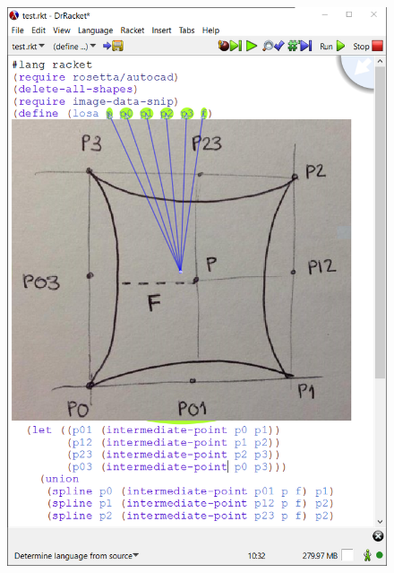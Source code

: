 \begin{figure}[h]
\centering
\begin{minipage}[t]{.495\textwidth}
  \centering
  \includegraphics[width=1\linewidth]{images/losa0}
  \label{fig:losa0}
\end{minipage}%
~
~
\begin{minipage}[t]{.495\textwidth}
  \centering

\end{minipage}
\end{figure}
